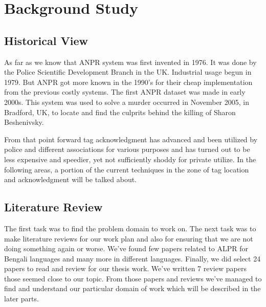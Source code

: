 \documentclass{standalone}
\begin{document}
\chapter{Background Study}

\section{Historical View}
As far as we know that ANPR system was first invented in 1976. It was done by the Police Scientific Development Branch in the UK. Industrial usage begun in 1979. But ANPR got more known in the 1990's for their cheap implementation from the previous costly systems. The first ANPR dataset was made in early 2000s. This system was used to solve a murder occurred in November 2005, in Bradford, UK, to locate and find the culprits behind the killing of Sharon Beshenivsky.

From that point forward tag acknowledgment has advanced and been utilized by police and different associations for various purposes and has turned out to be less expensive and speedier, yet not sufficiently shoddy for private utilize. In the following areas, a portion of the current techniques in the zone of tag location and acknowledgment will be talked about.

\section{Literature Review}
The first task was to find the problem domain to work on. The next task was to make literature reviews for our work plan and also for ensuring that we are not doing something again or worse. We've found few papers related to ALPR for Bengali languages and many more in different languages. Finally, we did select 24 papers to read and review for our thesis work. We've written 7 review papers those seemed close to our topic. From those papers and reviews we've managed to find and understand our particular domain of work which will be described in the later parts.
\end{document}
